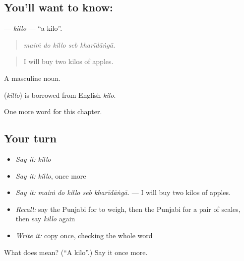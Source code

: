 \subsection*{You'll want to know: }
\textbf{} — \emph{killo} — \textquotedblleft{}a kilo\textquotedblright{}.

\begin{quote}
    
\end{quote}

\begin{quote}
\emph{maiṁ do killo seb kharīdāṅgā.}
\end{quote}

\begin{quote}
I will buy two kilos of apples.
\end{quote}

A masculine noun.

\begin{cousinweb}
\textbf{} (\emph{killo}) is borrowed from English \emph{kilo}.
\end{cousinweb}

\begin{grammarlens}[title={What you've built}]
One more word for this chapter.
\end{grammarlens}

\subsection*{Your turn}
\begin{itemize}
\raggedright
  \item \emph{Say it:} \emph{killo}
  \item \emph{Say it:} \emph{killo}, once more
  \item \emph{Say it:} \emph{maiṁ do killo seb kharīdāṅgā.} — I will buy two kilos of apples.
  \item \emph{Recall:} say the Punjabi for to weigh, then the Punjabi for a pair of scales, then say \emph{killo} again
  \item \emph{Write it:} copy \textbf{} once, checking the whole word
\end{itemize}

\begin{tcolorbox}[breakable,colback=teal!4,colframe=teal!35!black,title={Before you move on}]
What does  mean? (\textquotedblleft{}A kilo\textquotedblright{}.) Say it once more.
\end{tcolorbox}

